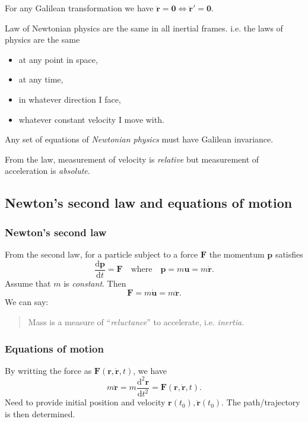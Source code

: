 \begin{note}
    For any Galilean transformation we have $ \ddot{\mathbf{r}}=\mathbf{0} \Longleftrightarrow \ddot{\mathbf{r}}'=\mathbf{0} $.
\end{note}

\begin{law}
    Law of Newtonian physics are the same in all inertial frames. i.e. the laws of physics are the same
    \begin{itemize}
        \item at any point in space,
        \item at any time,
        \item in whatever direction I face,
        \item whatever constant velocity I move with.
    \end{itemize}
    Any set of equations of \textit{Newtonian physics} must have Galilean invariance.
\end{law}

\begin{note}
    From the law, measurement of velocity is \textit{relative} but measurement of acceleration is \textit{absolute}.
\end{note}

\subsection{Newton's second law and equations of motion}
\subsubsection*{Newton's second law}

From the second law, for a particle subject to a force $\mathbf{F}$ the momentum $\mathbf{p}$ satisfies
\[
    \frac{\mathrm{d}\mathbf{p}}{\mathrm{d}t} = \mathbf{F} \quad \text{where}\quad \mathbf{p}=m\mathbf{u}=m \dot{\mathbf{r}}. 
\]
Assume that $m$ is \textit{constant}. Then 
\[
    \mathbf{F} = m \dot{\mathbf{u}} = m \ddot{\mathbf{r}}.
\]
We can say: 
\begin{quote}
    Mass is a measure of ``\textit{reluctance}'' to accelerate, i.e. \textit{inertia}.
\end{quote}

\subsubsection*{Equations of motion}
By writting the force as $ \mathbf{F}(\mathbf{r},\dot{\mathbf{r}},t) $, we have 
\[
    m \ddot{\mathbf{r}} = m \frac{\mathrm{d}^2 \mathbf{r}}{\mathrm{d}t^2} = \mathbf{F}(\mathbf{r},\dot{\mathbf{r}},t). 
\]
Need to provide initial position and velocity $ \mathbf{r}(t_0),\dot{\mathbf{r}}(t_0) $. The path/trajectory is then determined.

